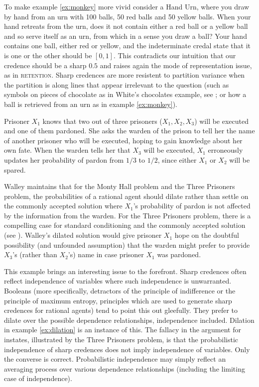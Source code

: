\documentclass[11pt]{article}
\begin{document}
To make example \ref{ex:monkey} more vivid consider a Hand Urn, where
you draw by hand from an urn with 100 balls, 50 red balls and 50
yellow balls. When your hand retreats from the urn, does it not
contain either a red ball or a yellow ball and so serve itself as an
urn, from which in a sense you draw a ball? Your hand contains one
ball, either red or yellow, and the indeterminate credal state that it
is one or the other should be $[0,1]$. This contradicts our intuition
that our credence should be a sharp $0.5$ and raises again the mode of
representation issue, as in \textsc{retention}. Sharp credences are
more resistent to partition variance when the partition is along lines
that appear irrelevant to the question (such as symbols on pieces of
chocolate as in White's chocolates example, see
; or how a ball is retrieved from an urn as in
example \ref{ex:monkey}).

\begin{quotex}
  \label{ex:threepris} Prisoner $X_{1}$
  knows that two out of three prisoners ($X_{1},X_{2},X_{3}$) will be
  executed and one of them pardoned. She asks the warden of the prison
  to tell her the name of another prisoner who will be executed,
  hoping to gain knowledge about her own fate. When the warden tells
  her that $X_{3}$ will be executed, $X_{1}$ erroneously updates her
  probability of pardon from $1/3$ to $1/2$, since either $X_{1}$ or
  $X_{2}$ will be spared.
\end{quotex}

Walley maintains that for the Monty Hall problem and the Three
Prisoners problem, the probabilities of a rational agent should dilate
rather than settle on the commonly accepted solution where $X_{1}$'s
probability of pardon is not affected by the information from the
warden. For the Three Prisoners problem, there is a compelling case
for standard conditioning and the commonly accepted solution (see
). Walley's dilated solution would give
prisoner $X_{1}$ hope on the doubtful possibility (and unfounded
assumption) that the warden might prefer to provide $X_{3}$'s (rather
than $X_{2}$'s) name in case prisoner $X_{1}$ was pardoned.

This example brings an interesting issue to the forefront. Sharp
credences often reflect independence of variables where such
independence is unwarranted. Booleans (more specifically, detractors
of the principle of indifference or the principle of maximum entropy,
principles which are used to generate sharp credences for rational
agents) tend to point this out gleefully. They prefer to dilate over
the possible dependence relationships, independence included. Dilation
in example \ref{ex:dilation} is an instance of this. The fallacy in
the argument for instates, illustrated by the Three Prisoners problem,
is that the probabilistic independence of sharp credences does not
imply independence of variables. Only the converse is correct.
Probabilistic independence may simply reflect an averaging process
over various dependence relationships (including the limiting case of
independence).
\end{document}
